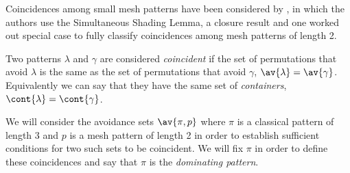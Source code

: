 Coincidences among small mesh patterns have been considered by
\textcite{DBLP:journals/corr/ClaessonTU14}, in which the authors use the Simultaneous Shading Lemma,
a closure result and one worked out special case to fully classify coincidences among mesh patterns
of length 2.

Two patterns \(\lambda\) and \(\gamma\) are considered \emph{coincident} if the set of permutations
that avoid \(\lambda\) is the same as the set of permutations that avoid \(\gamma\),
\ie \(\av{\lambda} = \av{\gamma}\). Equivalently we can say that they have the same set of
\emph{containers},\ie \(\cont{\lambda} = \cont{\gamma}\).

We will consider the avoidance sets \(\av{\pi,p}\) where \(\pi\) is a classical pattern of length 3
and \(p\) is a mesh pattern of length 2 in order to establish sufficient conditions for two such
sets to be coincident. We will fix \(\pi\) in order to define these coincidences and say that
\(\pi\) is the \emph{dominating pattern}.

